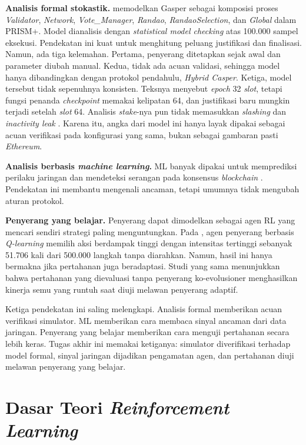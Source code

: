 \textbf{Analisis formal stokastik.} \textcite{laneve2025stochastic} memodelkan Gasper sebagai komposisi proses \textit{Validator}, \textit{Network}, \textit{Vote\_Manager}, \textit{Randao}, \textit{RandaoSelection}, dan \textit{Global} dalam PRISM+. Model dianalisis dengan \textit{statistical model checking} atas 100.000 sampel eksekusi. Pendekatan ini kuat untuk menghitung peluang justifikasi dan finalisasi. Namun, ada tiga kelemahan. Pertama, penyerang ditetapkan sejak awal dan parameter diubah manual. Kedua, tidak ada acuan validasi, sehingga model hanya dibandingkan dengan protokol pendahulu, \textit{Hybrid Casper}. Ketiga, model tersebut tidak sepenuhnya konsisten. Teksnya menyebut \textit{epoch} 32 \textit{slot}, tetapi fungsi penanda \textit{checkpoint} memakai kelipatan 64, dan justifikasi baru mungkin terjadi setelah \textit{slot} 64. Analisis \textit{stake}-nya pun tidak memasukkan \textit{slashing} dan \textit{inactivity leak} \parencite{laneve2025stochastic}. Karena itu, angka dari model ini hanya layak dipakai sebagai acuan verifikasi pada konfigurasi yang sama, bukan sebagai gambaran pasti \textit{Ethereum}.

\textbf{Analisis berbasis \textit{machine learning}.} ML banyak dipakai untuk memprediksi perilaku jaringan dan mendeteksi serangan pada konsensus \textit{blockchain} \parencite{rizal2025enhancing}. Pendekatan ini membantu mengenali ancaman, tetapi umumnya tidak mengubah aturan protokol.

\textbf{Penyerang yang belajar.} Penyerang dapat dimodelkan sebagai agen RL yang mencari sendiri strategi paling menguntungkan. Pada \textcite{wushishi2026coadam}, agen penyerang berbasis \textit{Q-learning} memilih aksi berdampak tinggi dengan intensitas tertinggi sebanyak 51.706 kali dari 500.000 langkah tanpa diarahkan. Namun, hasil ini hanya bermakna jika pertahanan juga beradaptasi. Studi yang sama menunjukkan bahwa pertahanan yang dievaluasi tanpa penyerang ko-evolusioner menghasilkan kinerja semu yang runtuh saat diuji melawan penyerang adaptif.

Ketiga pendekatan ini saling melengkapi. Analisis formal memberikan acuan verifikasi simulator. ML memberikan cara membaca sinyal ancaman dari data jaringan. Penyerang yang belajar memberikan cara menguji pertahanan secara lebih keras. Tugas akhir ini memakai ketiganya: simulator diverifikasi terhadap model formal, sinyal jaringan dijadikan pengamatan agen, dan pertahanan diuji melawan penyerang yang belajar.

\section{Dasar Teori \textit{Reinforcement Learning}}
\label{sec:teori_rl}

